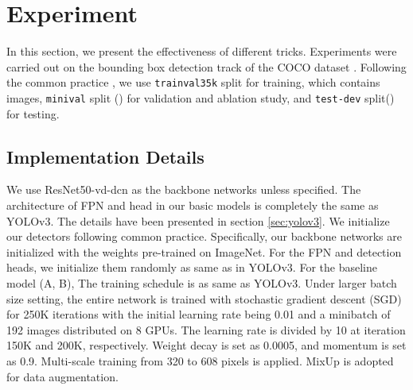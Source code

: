 \documentclass[10pt,twocolumn,letterpaper]{article}
\begin{document}
	
	\section{Experiment}
	
	In this section, we present the effectiveness of different tricks.
	Experiments were carried out on the bounding box detection track of the COCO dataset \cite{coco}. 
	Following the common practice \cite{yolov3,Mingxing2020EfficientDet,yolov4}, we use \texttt{trainval35k} split for training, which contains  images, \texttt{minival} split () for validation and ablation study, and \texttt{test-dev} split() for testing. 
	
	\subsection{Implementation Details} \label{sec:detail}
	
	We use ResNet50-vd-dcn\cite{resnet} as the backbone networks unless specified. The architecture of FPN and head in our basic models is completely the same as YOLOv3\cite{yolov3}. The details have been presented in section \ref{sec:yolov3}.
	We initialize our detectors following common practice. Specifically, our backbone networks are initialized with the weights pre-trained
	on ImageNet\cite{imagenet}. For the FPN and detection heads, we initialize them randomly as same as in YOLOv3\cite{yolov3}.
	For the baseline model (A, B), The training schedule is as same as YOLOv3. Under larger batch size setting, the entire network is trained with stochastic gradient descent (SGD) for 250K iterations with the initial learning rate being 0.01 and a minibatch of 192 images distributed on 8 GPUs. The learning rate is divided by 10 at iteration 150K and 200K, respectively. Weight decay is set as 0.0005, and momentum is set as 0.9. 
	Multi-scale training from 320 to 608 pixels is applied. MixUp\cite{mixup} is adopted for data augmentation. 
	
\end{document}
